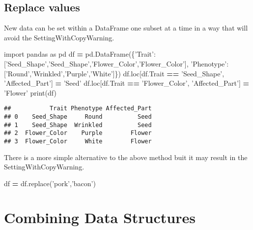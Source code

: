 \documentclass[]{book}
\newenvironment{Shaded}{\begin{snugshade}}{\end{snugshade}}
\newcommand{\BuiltInTok}[1]{#1}
\newcommand{\ImportTok}[1]{#1}
\newcommand{\NormalTok}[1]{#1}
\newcommand{\OperatorTok}[1]{\textcolor[rgb]{0.81,0.36,0.00}{\textbf{#1}}}
\newcommand{\StringTok}[1]{\textcolor[rgb]{0.31,0.60,0.02}{#1}}
\begin{document}
\hypertarget{replace-values}{%
\subsection{Replace values}\label{replace-values}}

New data can be set within a DataFrame one subset at a time in a way that will avoid the SettingWithCopyWarning.

\begin{Shaded}
\begin{Highlighting}[]
\ImportTok{import}\NormalTok{ pandas }\ImportTok{as}\NormalTok{ pd}
\NormalTok{df }\OperatorTok{=}\NormalTok{ pd.DataFrame(\{}\StringTok{'Trait'}\NormalTok{:[}\StringTok{'Seed_Shape'}\NormalTok{,}\StringTok{'Seed_Shape'}\NormalTok{,}\StringTok{'Flower_Color'}\NormalTok{,}\StringTok{'Flower_Color'}\NormalTok{],}
                    \StringTok{'Phenotype'}\NormalTok{:[}\StringTok{'Round'}\NormalTok{,}\StringTok{'Wrinkled'}\NormalTok{,}\StringTok{'Purple'}\NormalTok{,}\StringTok{'White'}\NormalTok{]\})}
\NormalTok{df.loc[df.Trait }\OperatorTok{==} \StringTok{'Seed_Shape'}\NormalTok{, }\StringTok{'Affected_Part'}\NormalTok{] }\OperatorTok{=} \StringTok{'Seed'}
\NormalTok{df.loc[df.Trait }\OperatorTok{==} \StringTok{'Flower_Color'}\NormalTok{, }\StringTok{'Affected_Part'}\NormalTok{] }\OperatorTok{=} \StringTok{'Flower'}
\BuiltInTok{print}\NormalTok{(df)}
\end{Highlighting}
\end{Shaded}

\begin{verbatim}
##           Trait Phenotype Affected_Part
## 0    Seed_Shape     Round          Seed
## 1    Seed_Shape  Wrinkled          Seed
## 2  Flower_Color    Purple        Flower
## 3  Flower_Color     White        Flower
\end{verbatim}

There is a more simple alternative to the above method buit it may result in the SettingWithCopyWarning.

\begin{Shaded}
\begin{Highlighting}[]
\NormalTok{df }\OperatorTok{=}\NormalTok{ df.replace(}\StringTok{'pork'}\NormalTok{,}\StringTok{'bacon'}\NormalTok{)}
\end{Highlighting}
\end{Shaded}

\hypertarget{combining-data-structures}{%
\section{Combining Data Structures}\label{combining-data-structures}}
\end{document}
